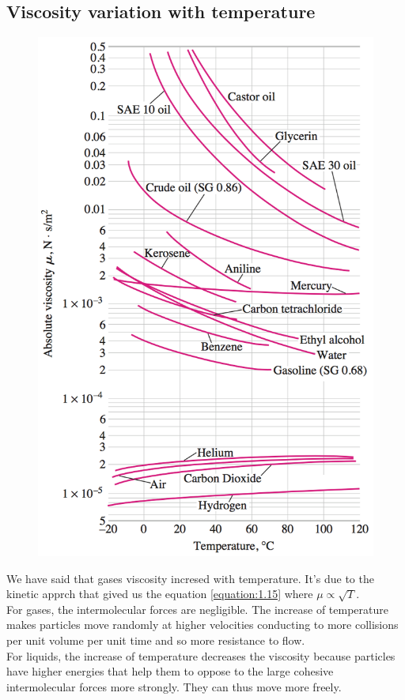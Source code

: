 \subsection{Viscosity variation with temperature}
\label{subsec:viscogas}
\begin{figure}
	\vspace{-10mm}
	\includegraphics[scale=0.25]{ch1/10}
\end{figure}
We have said that gases viscosity incresed with temperature. It's due to the kinetic apprch that gived us the equation \eqref{equation:1.15} where $\mu \propto \sqrt{T}$. \\
For gases, the intermolecular forces are negligible. The increase of temperature makes particles move randomly at higher velocities conducting to more collisions per unit volume per unit time and so more resistance to flow. \\
For liquids, the increase of temperature decreases the viscosity because particles have higher energies that help them to oppose to the large cohesive intermolecular forces more strongly. They can thus move more freely. 

